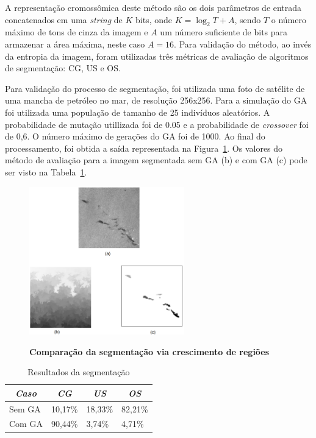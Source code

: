 \documentclass[12pt,oneside,a4paper,english,french,spanish,brazil,]{abntex2}
\begin{document}

A representação cromossômica deste método são os dois parâmetros de entrada concatenados em uma \textit{string} de \(K\) bits, onde \(K = \log_2 T + A\), sendo \(T\) o número máximo de tons de cinza da imagem e \(A\) um número suficiente de bits para armazenar a área máxima, neste caso \(A = 16\). Para validação do método, ao invés da entropia da imagem, foram utilizadas três métricas de avaliação de algoritmos de segmentação: CG, US e OS.

Para validação do processo de segmentação, foi utilizada uma foto de satélite de uma mancha de petróleo no mar, de resolução 256x256. Para a simulação do GA foi utilizada uma população de tamanho de 25 indivíduos aleatórios. A probabilidade de mutação utillizada foi de 0.05 e a probabilidade de \textit{crossover} foi de 0,6. O número máximo de gerações do GA foi de 1000. Ao final do processamento, foi obtida a saída representada na Figura~\ref{fig:TrCo_Matias_Crescimento_1}. Os valores do método de avaliação para a imagem segmentada sem GA (b) e com GA (c) pode ser visto na Tabela~\ref{tab:TrCo_Matias_1}.

\begin{figure}[ht]
\centering
\caption{\textbf{Comparação da segmentação via crescimento de regiões}}
\includegraphics[width=0.6\textwidth]{imagens/TrCo_Matias_Crescimento_1.PNG}
\label{fig:TrCo_Matias_Crescimento_1}
\end{figure}

\begin{table}[]
\centering
\caption{Resultados da segmentação}
\label{tab:TrCo_Matias_1}
\begin{tabular}{llll}
\hline
\multicolumn{1}{c}{\textit{\textbf{Caso}}} & \multicolumn{1}{c}{\textit{\textbf{CG}}} & \multicolumn{1}{c}{\textit{\textbf{US}}} & \multicolumn{1}{c}{\textit{\textbf{OS}}} \\ \hline
Sem GA                                     & 10,17\%                                  & 18,33\%                                  & 82,21\%                                  \\
Com GA                                     & 90,44\%                                  & 3,74\%                                   & 4,71\%                                   \\ \hline
\end{tabular}
\end{table}
\end{document}
